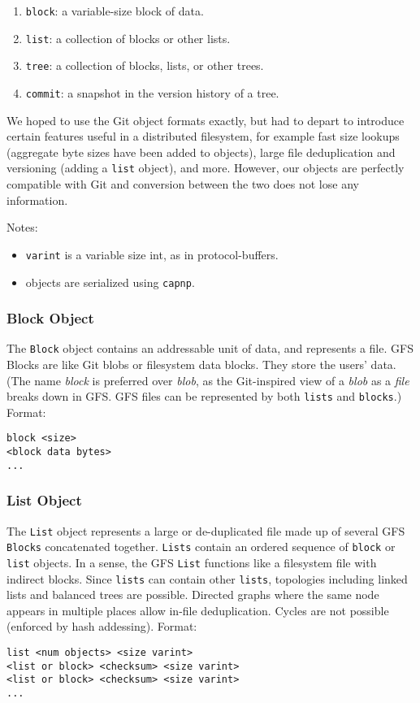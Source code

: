 \documentclass{sig-alternate}
\begin{document}
\begin{enumerate}
  \item \texttt{block}: a variable-size block of data.
  \item \texttt{list}: a collection of blocks or other lists.
  \item \texttt{tree}: a collection of blocks, lists, or other trees.
  \item \texttt{commit}: a snapshot in the version history of a tree.
\end{enumerate}

We hoped to use the Git object formats exactly, but had to depart to introduce
certain features useful in a distributed filesystem, for example fast size
lookups (aggregate byte sizes have been added to objects), large file
deduplication and versioning (adding a \texttt{list} object), and more.
However, our objects are perfectly compatible with Git and
conversion between the two does not lose any information.

Notes:
\begin{itemize}
  \item \texttt{varint} is a variable size int, as in protocol-buffers.
  \item objects are serialized using \texttt{capnp}.
\end{itemize}

\subsubsection{Block Object}

The \texttt{Block} object contains an addressable unit of data, and
represents a file.
GFS Blocks are like Git blobs or filesystem data blocks. They store the
users' data. (The name \textit{block} is preferred over \textit{blob}, as the
Git-inspired view of a \textit{blob} as a \textit{file} breaks down in GFS.
GFS files can be represented by both \texttt{lists} and \texttt{blocks}.)
Format:
\begin{verbatim}
block <size>
<block data bytes>
...
\end{verbatim}


\subsubsection{List Object}

The \texttt{List} object represents a large or de-duplicated file made up of
several GFS \texttt{Blocks} concatenated together. \texttt{Lists} contain
an ordered sequence of \texttt{block} or \texttt{list} objects.
In a sense, the GFS \texttt{List} functions like a filesystem file with
indirect blocks. Since \texttt{lists} can contain other \texttt{lists}, topologies including linked lists and balanced trees are possible. Directed graphs where the same node appears in multiple places allow in-file deduplication. Cycles are not possible (enforced by hash addessing).
Format:
\begin{verbatim}
list <num objects> <size varint>
<list or block> <checksum> <size varint>
<list or block> <checksum> <size varint>
...
\end{verbatim}
\end{document}
